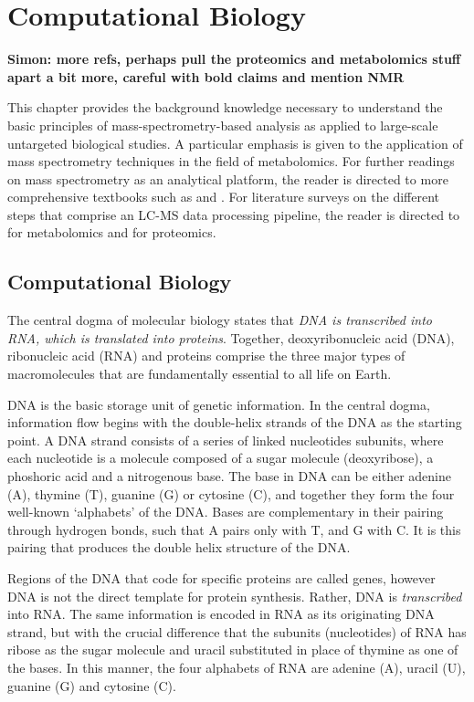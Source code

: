 \chapter{Computational Biology}
\label{c:background}


\textbf{Simon: more refs, perhaps pull the proteomics and metabolomics stuff apart a bit more, careful with bold claims and mention NMR}

This chapter provides the background knowledge necessary to understand the basic principles of mass-spectrometry-based analysis as applied to large-scale untargeted biological studies. A particular emphasis is given to the application of mass spectrometry techniques in the field of metabolomics. For further readings on mass spectrometry as an analytical platform, the reader is directed to more comprehensive textbooks such as \cite{Hoffmann2007} and \cite{gross2006mass}. For literature surveys on the different steps that comprise an LC-MS data processing pipeline, the reader is directed to \cite{Castillo2011,Smith2014,Gika2014,Alonso2015} for metabolomics and \cite{Sandin2014, Megger2013, Smith2014} for proteomics.

\section{Computational Biology}

The central dogma of molecular biology states that \emph{DNA is transcribed into RNA, which is translated into proteins}. Together, deoxyribonucleic acid (DNA), ribonucleic acid (RNA) and proteins comprise the three major types of macromolecules that are fundamentally essential to all life on Earth. 

DNA is the basic storage unit of genetic information. In the central dogma, information flow begins with the double-helix strands of the DNA as the starting point. A DNA strand consists of a series of linked nucleotides subunits, where each nucleotide is a molecule composed of a sugar molecule (deoxyribose), a phoshoric acid and a nitrogenous base. The base in DNA can be either adenine (A), thymine (T), guanine (G) or cytosine (C), and together they form the four well-known `alphabets' of the DNA. Bases are complementary in their pairing through hydrogen bonds, such that A pairs only with T, and G with C. It is this pairing that produces the double helix structure of the DNA. 

Regions of the DNA that code for specific proteins are called genes, however DNA is not the direct template for protein synthesis. Rather, DNA is \emph{transcribed} into RNA. The same information is encoded in RNA as its originating DNA strand, but with the crucial difference that the subunits (nucleotides) of RNA has ribose as the sugar molecule and uracil substituted in place of thymine as one of the bases. In this manner, the four alphabets of RNA are adenine (A), uracil (U), guanine (G) and cytosine (C). 

